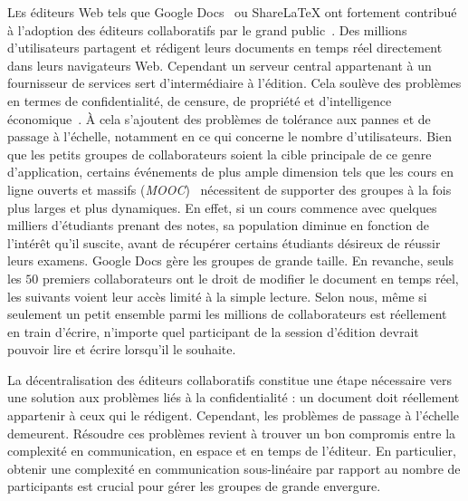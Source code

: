 
\lettrine{L}es éditeurs Web tels que Google Docs~\cite{googledocs} ou
ShareLaTeX\cite{sharelatex} ont fortement contribué à l'adoption des éditeurs
collaboratifs par le grand public~\cite{mogan2010impact}. Des millions
d'utilisateurs partagent et rédigent leurs documents en temps réel directement
dans leurs navigateurs Web. Cependant un serveur central appartenant à un
fournisseur de services sert d'intermédiaire à l'édition. Cela soulève des
problèmes en termes de confidentialité, de censure, de propriété et
d'intelligence économique~\cite{cherrueau2016composer, gellman2013us,
pearson2011toward}. À cela s'ajoutent des problèmes de tolérance aux pannes et
de passage à l'échelle, notamment en ce qui concerne le nombre
d'utilisateurs. Bien que les petits groupes de collaborateurs soient la cible
principale de ce genre d'application, certains événements de plus ample
dimension tels que les cours en ligne ouverts et massifs
(\emph{MOOC})~\cite{breslow2013studying} nécessitent de supporter des groupes à
la fois plus larges et plus dynamiques. En effet, si un cours commence avec
quelques milliers d'étudiants prenant des notes, sa population diminue en
fonction de l'intérêt qu'il suscite, avant de récupérer certains étudiants
désireux de réussir leurs examens. Google Docs gère les groupes de grande
taille. En revanche, seuls les $50$ premiers collaborateurs ont le droit de
modifier le document en temps réel, les suivants voient leur accès limité à la
simple lecture. Selon nous, même si seulement un petit ensemble parmi les
millions de collaborateurs est réellement en train d'écrire, n'importe quel
participant de la session d'édition devrait pouvoir lire et écrire lorsqu'il le
souhaite.

La décentralisation des éditeurs collaboratifs constitue une étape nécessaire
vers une solution aux problèmes liés à la confidentialité : un document doit
réellement appartenir à ceux qui le rédigent. Cependant, les problèmes de
passage à l'échelle demeurent. Résoudre ces problèmes revient à trouver un bon
compromis entre la complexité en communication, en espace et en temps de
l'éditeur. En particulier, obtenir une complexité en communication sous-linéaire
par rapport au nombre de participants est crucial pour gérer les groupes de
grande envergure.

